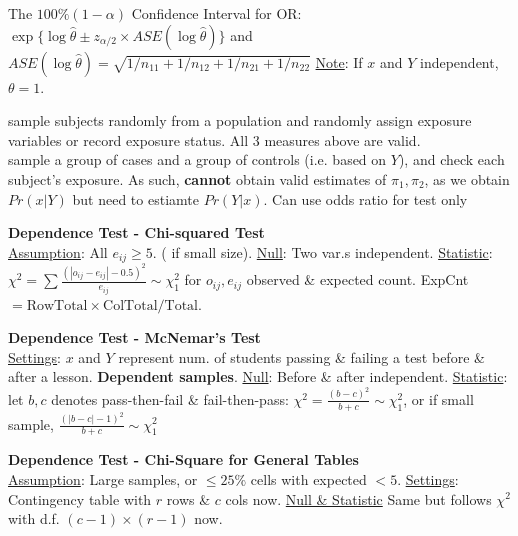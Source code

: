 \documentclass[10pt,landscape,letterpaper]{article}
\makeatletter
\renewcommand{\subsection}{\@startsection{subsection}{2}{0mm}%
                                {-1explus -.5ex minus -.2ex}%
                                {0.5ex plus .2ex}%
                                {\sffamily\normalsize\itshape}}
\renewcommand{\subsubsection}{\@startsection{subsubsection}{3}{0mm}%
                                {-1ex plus -.5ex minus -.2ex}%
                                {1ex plus .2ex}%
                                {\normalfont\small\itshape}}
\makeatother
\begin{document}
\begin{multicols}{3}
The $100\%(1-\alpha)$ Confidence Interval for OR:
$
\exp \{ \log \hat{\theta} \pm z_{\alpha / 2} \times ASE(\log \hat{\theta})  \}
$
and
$
ASE(\log \hat{\theta}) = \sqrt{ 1/n_{11} + 1/n_{12} + 1/n_{21} + 1/n_{22}  }
$
\underline{Note}: If $x$ and $Y$ independent, $\theta = 1$.

 sample subjects randomly from a population and randomly assign exposure variables or record exposure status. All 3 measures above are valid.
\\
 sample a group of cases and a group of controls (i.e. based on $Y$), and check each subject's exposure. As such, \textbf{cannot} obtain valid estimates of $\pi_1, \pi_2$, as we obtain $Pr(x|Y)$ but need to estiamte $Pr(Y|x)$. Can use odds ratio for test 
only



\textbf{Dependence Test - Chi-squared Test}
\\
\underline{Assumption}: All $e_{ij} \ge 5$. ( if small size). 
\underline{Null}: Two var.s independent. 
\underline{Statistic}:
$
\chi^2 = \sum \frac{(|o_{ij} - e_{ij}| - 0.5)^2}{e_{ij}} \sim \chi^2_1
$
for $o_{ij}, e_{ij}$ observed \& expected count. ExpCnt $= \text{RowTotal} \times \text{ColTotal} / \text{Total}$.


\textbf{Dependence Test - McNemar's Test}
\\
\underline{Settings}: $x$ and $Y$ represent num. of students passing \& failing a test before \& after a lesson. \textbf{Dependent samples}. 
\underline{Null}: Before \& after independent. 
\underline{Statistic}: let $b,c$ denotes pass-then-fail \& fail-then-pass:
$
\chi^2 = \frac{(b-c)^2}{b+c}  \sim \chi^2_1$, or if small sample, $\frac{(|b-c|-1)^2}{b+c} \sim \chi^2_1$


\textbf{Dependence Test -  Chi-Square for General Tables}
\\
\underline{Assumption}: Large samples, or $\le 25\%$ cells with expected $< 5$.
\underline{Settings}: Contingency table with $r$ rows \& $c$ cols now. \underline{Null \& Statistic} Same but follows $\chi^2$ with d.f. ${(c-1) \times (r-1)}$ now.


\end{multicols}
\end{document}
